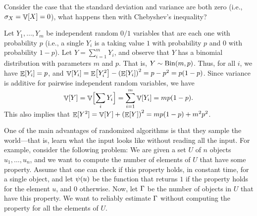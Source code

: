 \begin{exercise}
    Consider the case that the standard deviation and variance are both
    zero (i.e., $\sigma_X = \mathop{\mathbb{V}}\!\left[ {X} \right] = 0$), what happens then with
    Chebyshev's inequality?
\end{exercise}

\begin{example}
    Let $Y_1, \ldots, Y_m$ be independent random $0/1$ variables that are
    each one with probability $p$ (i.e., a single $Y_i$ is a
     taking value $1$ with probability
    $p$ and $0$ with probability $1-p$).  Let $Y = \sum_{i=1}^m Y_i$, and
    observe that $Y$ has a binomial distribution with parameters $m$ and
    $p$.  That is, $Y \sim \DistBinom{m}{p}$. Thus, for all $i$, we have
    $\mathop{\mathbb{E}}\!\left[ {Y_i} \right] = p$, and
    $\Var{Y_i} = \Ex{Y_i^2} - \pth{\Ex{Y_i}}^2 = p - p^2 = p(1-p)$. Since
    variance is additive for pairwise independent random variables, we
    have
    \begin{equation}
        \Var{Y} = \Var{\Bigl. \smash{\sum_i Y_i}} =
        \smash{\sum_{i=1}^m \Var{Y_i}} = m p (1-p).
        \eqlab{var-bionomial}
    \end{equation}
    This also implies that
    $\Ex{\smash{Y^2}} = \Var{Y} + \pth{\Ex{Y}}^2 = m p (1-p) + m^2 p^2$.
\end{example}










One of the main advantages of randomized algorithms is that they sample
the world---that is, learn what the input looks like without reading all
the input. For example, consider the following problem: We are given a
set $U$ of $n$ objects $u_1, \ldots, u_n$, and we want to compute the number
of elements of $U$ that have some property. Assume that one can check if
this property holds, in constant time, for a single object, and let
$\propertyX{u}$ be the function that returns $1$ if the property holds
for the element $u$, and $0$ otherwise.  Now, let $\Gamma$ be the number
of objects in $U$ that have this property. We want to reliably estimate
$\Gamma$ without computing the property for all the elements of $U$.

